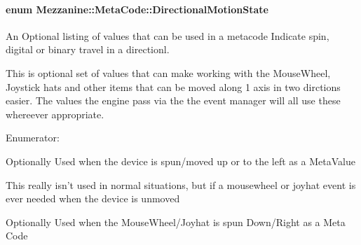 \hypertarget{classMezzanine_1_1MetaCode_ad37143a88b8c94cb6b2f40f5d66104ad}{
\paragraph[{DirectionalMotionState}]{\setlength{\rightskip}{0pt plus 5cm}enum {\bf Mezzanine::MetaCode::DirectionalMotionState}}\hfill}
\label{classMezzanine_1_1MetaCode_ad37143a88b8c94cb6b2f40f5d66104ad}


An Optional listing of values that can be used in a metacode Indicate spin, digital or binary travel in a directionl. 

This is optional set of values that can make working with the MouseWheel, Joystick hats and other items that can be moved along 1 axis in two dirctions easier. The values the engine pass via the the event manager will all use these whereever appropriate. \begin{Desc}
\item[Enumerator: ]\par
\begin{description}
\item[{\em 
\hypertarget{classMezzanine_1_1MetaCode_ad37143a88b8c94cb6b2f40f5d66104adaab0a7592ad86de4ba170afc0d3c99ead}{
DIRECTIONALMOTION\_\-UPLEFT}
\label{classMezzanine_1_1MetaCode_ad37143a88b8c94cb6b2f40f5d66104adaab0a7592ad86de4ba170afc0d3c99ead}
}]Optionally Used when the device is spun/moved up or to the left as a MetaValue \item[{\em 
\hypertarget{classMezzanine_1_1MetaCode_ad37143a88b8c94cb6b2f40f5d66104adadd21933bb9cb8f213ed01ff59dd04f37}{
DIRECTIONALMOTION\_\-UNCHANGED}
\label{classMezzanine_1_1MetaCode_ad37143a88b8c94cb6b2f40f5d66104adadd21933bb9cb8f213ed01ff59dd04f37}
}]This really isn't used in normal situations, but if a mousewheel or joyhat event is ever needed when the device is unmoved \item[{\em 
\hypertarget{classMezzanine_1_1MetaCode_ad37143a88b8c94cb6b2f40f5d66104ada11a3bc63626fe380e329ea5983876753}{
DIRECTIONALMOTION\_\-DOWNRIGHT}
\label{classMezzanine_1_1MetaCode_ad37143a88b8c94cb6b2f40f5d66104ada11a3bc63626fe380e329ea5983876753}
}]Optionally Used when the MouseWheel/Joyhat is spun Down/Right as a Meta Code \end{description}
\end{Desc}



